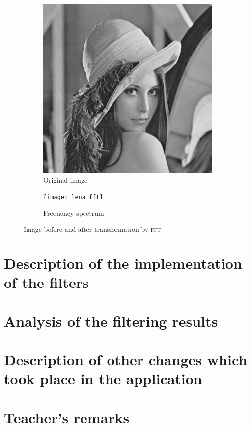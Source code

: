 \documentclass[12pt]{article}
\newcommand*{\fft}{\textsc{fft}}
\begin{document}
\begin{figure}[H]\centering
    \begin{subfigure}[ht]{.4\textwidth}\centering
        \includegraphics[width=\textwidth]{lena}
        \caption{Original image}
    \end{subfigure}
    \hspace*{2em}
    \begin{subfigure}[ht]{.4\textwidth}\centering
        \texttt{[image: lena\_fft]}
        \caption{Frequency spectrum}
    \end{subfigure}
    \caption{Image before and after transformation by \fft}
\end{figure}

\section{Description of the implementation of the filters}

\section{Analysis of the filtering results}

\section{Description of other changes which took place in the application}

\vfill
\section*{Teacher's remarks}
\begin{tabularx}{\textwidth}{|X|}
    \hline
    \vspace{7cm}
    \phantom{.} \\
    \hline
\end{tabularx}
\end{document}
